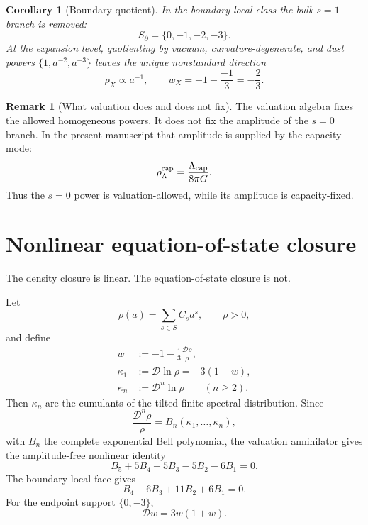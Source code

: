 \documentclass[aps,prd,reprint,nofootinbib,superscriptaddress]{revtex4-2}
\numberwithin{equation}{section}
\theoremstyle{definition}
\newtheorem{remark}{Remark}[section]
\theoremstyle{plain}
\newtheorem{corollary}{Corollary}[section]
\newcommand{\Dil}{\mathscr D}
\begin{document}
\begin{corollary}[Boundary quotient]\label{cor:boundary-quotient}
In the boundary-local class the bulk \(s=1\) branch is removed:
\begin{equation}
S_\partial=\{0,-1,-2,-3\}.
\end{equation}
At the expansion level, quotienting by vacuum, curvature-degenerate, and dust powers \(\{1,a^{-2},a^{-3}\}\) leaves the unique nonstandard direction
\begin{equation}
\boxed{
\rho_X\propto a^{-1},
\qquad
w_X=-1-\frac{-1}{3}=-\frac23.
}
\end{equation}
\end{corollary}

\begin{remark}[What valuation does and does not fix]
The valuation algebra fixes the allowed homogeneous powers.  It does not fix the amplitude of the \(s=0\) branch.  In the present manuscript that amplitude is supplied by the capacity mode:
\[
\rho_\Lambda^{\rm cap}=\frac{\Lambda_{\rm cap}}{8\pi G}.
\]
Thus the \(s=0\) power is valuation-allowed, while its amplitude is capacity-fixed.
\end{remark}


\section{Nonlinear equation-of-state closure}\label{sec:w-closure}

The density closure is linear.  The equation-of-state closure is not.

Let
\begin{equation}
\rho(a)=\sum_{s\in S}C_sa^s,\qquad \rho>0,
\end{equation}
and define
\begin{equation}
\begin{aligned}
w&:=-1-\frac{1}{3}\frac{\Dil\rho}{\rho},\\
\kappa_1&:=\Dil\ln\rho=-3(1+w),\\
\kappa_{n}&:=\Dil^n\ln\rho\qquad(n\ge2).
\end{aligned}
\end{equation}
Then \(\kappa_n\) are the cumulants of the tilted finite spectral distribution.  Since
\begin{equation}
\frac{\Dil^n\rho}{\rho}=B_n(\kappa_1,\ldots,\kappa_n),
\end{equation}
with \(B_n\) the complete exponential Bell polynomial, the valuation annihilator gives the amplitude-free nonlinear identity
\begin{equation}
\boxed{
B_5+5B_4+5B_3-5B_2-6B_1=0.
}
\end{equation}
The boundary-local face gives
\begin{equation}
\boxed{
B_4+6B_3+11B_2+6B_1=0.
}
\end{equation}
For the endpoint support \(\{0,-3\}\),
\begin{equation}
\boxed{
\Dil w=3w(1+w).
}
\end{equation}
\end{document}
